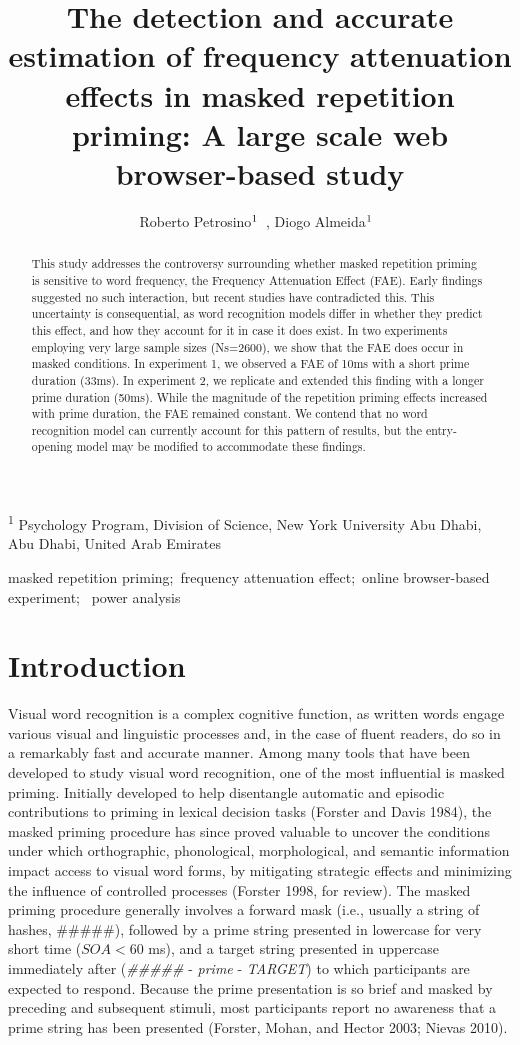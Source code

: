 \documentclass[
]{interact}
\title{The detection and accurate estimation of frequency attenuation
effects in masked repetition priming: A large scale web browser-based
study}
\author{Roberto
Petrosino$\textsuperscript{1}$~\orcidlink{0000-0002-8502-3070}, Diogo
Almeida$\textsuperscript{1}$~\orcidlink{0000-0003-4674-8092}}
\begin{document}
\captionsetup{labelsep=space}
\maketitle
\textsuperscript{1} Psychology Program, Division of Science, New York
University Abu Dhabi, Abu Dhabi, United Arab Emirates
\begin{abstract}
This study addresses the controversy surrounding whether masked
repetition priming is sensitive to word frequency, the Frequency
Attenuation Effect (FAE). Early findings suggested no such interaction,
but recent studies have contradicted this. This uncertainty is
consequential, as word recognition models differ in whether they predict
this effect, and how they account for it in case it does exist. In two
experiments employing very large sample sizes (Ns=2600), we show that
the FAE does occur in masked conditions. In experiment 1, we observed a
FAE of 10ms with a short prime duration (33ms). In experiment 2, we
replicate and extended this finding with a longer prime duration (50ms).
While the magnitude of the repetition priming effects increased with
prime duration, the FAE remained constant. We contend that no word
recognition model can currently account for this pattern of results, but
the entry-opening model may be modified to accommodate these findings.
\end{abstract}
\begin{keywords}
\def\sep{;\ }
masked repetition priming\sep frequency attenuation effect\sep online
browser-based experiment\sep 
power analysis
\end{keywords}


\section{Introduction}\label{sec-intro}

Visual word recognition is a complex cognitive function, as written
words engage various visual and linguistic processes and, in the case of
fluent readers, do so in a remarkably fast and accurate manner. Among
many tools that have been developed to study visual word recognition,
one of the most influential is masked priming. Initially developed to
help disentangle automatic and episodic contributions to priming in
lexical decision tasks (Forster and Davis 1984), the masked priming
procedure has since proved valuable to uncover the conditions under
which orthographic, phonological, morphological, and semantic
information impact access to visual word forms, by mitigating strategic
effects and minimizing the influence of controlled processes (Forster
1998, for review). The masked priming procedure generally involves a
forward mask (i.e., usually a string of hashes, \#\#\#\#\#), followed by
a prime string presented in lowercase for very short time (\(SOA < 60\)
ms), and a target string presented in uppercase immediately after
(\emph{\#\#\#\#\#} - \emph{prime} - \emph{TARGET}) to which participants
are expected to respond. Because the prime presentation is so brief and
masked by preceding and subsequent stimuli, most participants report no
awareness that a prime string has been presented (Forster, Mohan, and
Hector 2003; Nievas 2010).
\end{document}
